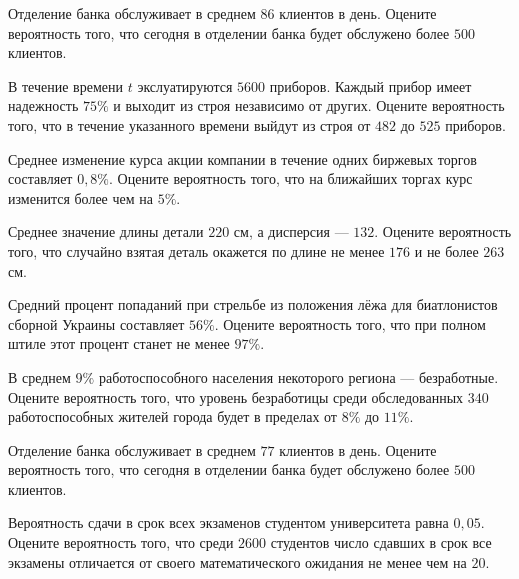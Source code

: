 \vfill

\newpage\setcounter{zad}{0}

\z Отделение банка обслуживает в среднем $ 86 $ клиентов в день. Оцените вероятность того, что сегодня в отделении банка будет обслужено более $ 500 $ клиентов.


\vfill

\z В течение времени $t$ экслуатируются $ 5600 $ приборов. Каждый прибор имеет надежность $ 75 \% $ и выходит из строя независимо от других. Оцените вероятность того, что в течение указанного времени выйдут из строя от $ 482 $ до $ 525 $ приборов.
 

\vfill

\newpage\setcounter{zad}{0}

\z Среднее изменение курса акции компании в течение одних биржевых торгов составляет $ 0{,}8 \% $. Оцените вероятность того, что на ближайших торгах курс изменится более чем на $ 5 \% $.


\vfill

\z Среднее значение длины детали $ 220 $ см, а дисперсия --- $ 132 $. Оцените вероятность того, что случайно взятая деталь окажется по длине не менее $ 176 $ и не более $ 263 $ см.
 

\vfill

\newpage\setcounter{zad}{0}

\z Средний процент попаданий при стрельбе из положения лёжа для биатлонистов сборной Украины составляет $ 56 \% $. Оцените вероятность того, что при полном штиле этот процент станет не менее $ 97 \% $.


\vfill

\z В среднем $ 9 \% $ работоспособного населения некоторого региона --- безработные. Оцените вероятность того, что уровень безработицы среди обследованных $ 340 $ работоспособных жителей города будет в пределах от $ 8 \%$ до $ 11 \%$.
 

\vfill

\newpage\setcounter{zad}{0}

\z Отделение банка обслуживает в среднем $ 77 $ клиентов в день. Оцените вероятность того, что сегодня в отделении банка будет обслужено более $ 500 $ клиентов.


\vfill

\z Вероятность сдачи в срок всех экзаменов студентом университета равна $ 0{,}05 $. Оцените вероятность того, что среди $ 2600 $ студентов число сдавших в срок все экзамены отличается от своего математического ожидания не менее чем на $ 20 $. 
 

